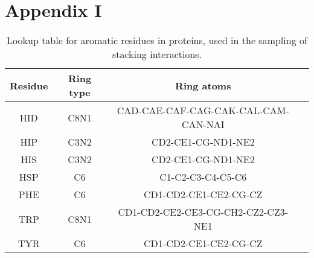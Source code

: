 \chapter{Appendix I}

\begin{table}[H]
  \caption{\label{tab:appx1/aromatic_prot} Lookup table for aromatic residues in proteins, used in the sampling of stacking interactions.}
  \centering
  \begin{tabular}{cccc}
    \hline
    Residue & Ring type  & Ring atoms                          \\ \hline
    HID     & C8N1       & CAD-CAE-CAF-CAG-CAK-CAL-CAM-CAN-NAI \\
    HIP     & C3N2       & CD2-CE1-CG-ND1-NE2                  \\
    HIS     & C3N2       & CD2-CE1-CG-ND1-NE2                  \\
    HSP     & C6         & C1-C2-C3-C4-C5-C6                   \\
    PHE     & C6         & CD1-CD2-CE1-CE2-CG-CZ               \\
    TRP     & C8N1       & CD1-CD2-CE2-CE3-CG-CH2-CZ2-CZ3-NE1  \\
    TYR     & C6         & CD1-CD2-CE1-CE2-CG-CZ               \\ \hline
  \end{tabular}
\end{table}

